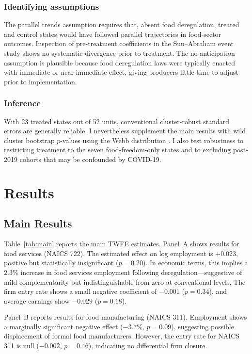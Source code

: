 \documentclass[12pt]{article}
\begin{document}
\subsubsection*{Identifying assumptions} The parallel trends assumption requires that, absent food deregulation, treated and control states would have followed parallel trajectories in food-sector outcomes. Inspection of pre-treatment coefficients in the Sun--Abraham event study shows no systematic divergence prior to treatment. The no-anticipation assumption is plausible because food deregulation laws were typically enacted with immediate or near-immediate effect, giving producers little time to adjust prior to implementation.

\subsubsection*{Inference} With 23 treated states out of 52 units, conventional cluster-robust standard errors are generally reliable. I nevertheless supplement the main results with wild cluster bootstrap $p$-values using the Webb distribution \citep{roodman2019fast, webb2023reworking}. I also test robustness to restricting treatment to the seven food-freedom-only states and to excluding post-2019 cohorts that may be confounded by COVID-19.

\section{Results}
\label{sec:results}

\subsection{Main Results}



Table~\ref{tab:main} reports the main TWFE estimates. Panel~A shows results for food services (NAICS 722). The estimated effect on log employment is $+0.023$, positive but statistically insignificant ($p = 0.20$). In economic terms, this implies a $2.3\%$ increase in food services employment following deregulation---suggestive of mild complementarity but indistinguishable from zero at conventional levels. The firm entry rate shows a small negative coefficient of $-0.001$ ($p = 0.34$), and average earnings show $-0.029$ ($p = 0.18$).

Panel~B reports results for food manufacturing (NAICS 311). Employment shows a marginally significant negative effect ($-3.7\%$, $p = 0.09$), suggesting possible displacement of formal food manufacturers. However, the entry rate for NAICS 311 is null ($-0.002$, $p = 0.46$), indicating no differential firm closure.
\end{document}
